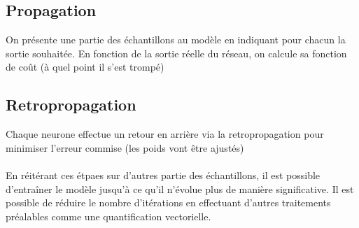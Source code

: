\documentclass[a4paper,12pt,oneside]{report}	%
\begin{document}
        \subsection*{Propagation}
            On présente une partie des échantillons au modèle en indiquant pour chacun la sortie souhaitée. En fonction de la sortie réelle du réseau, on calcule sa fonction de coût (à quel point il s'est trompé) 
        \subsection*{Retropropagation}
            Chaque neurone effectue un retour en arrière via la retropropagation pour minimiser l'erreur commise (les poids vont être ajustés)\\\\
        En réitérant ces étpaes sur d'autres partie des échantillons, il est possible d'entraîner le modèle jusqu'à ce qu'il n'évolue plus de manière significative. Il est possible de réduire le nombre d'itérations en effectuant d'autres traitements préalables comme une quantification vectorielle.
\end{document}
